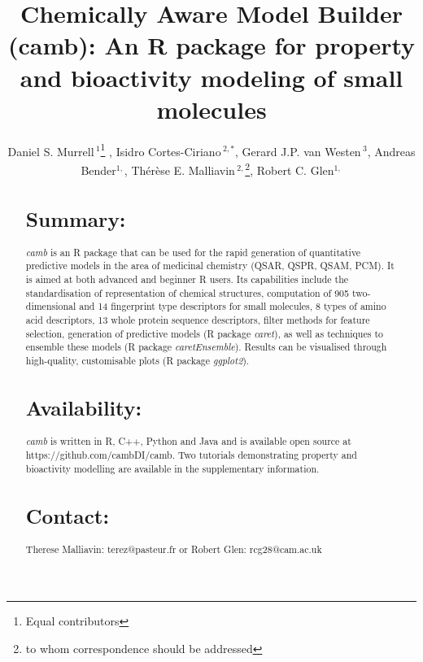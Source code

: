 \documentclass{bioinfo}
\begin{document}

\title{Chemically Aware Model Builder (camb): An R package for property and bioactivity modeling of small molecules}
\author[Murrell \& Cortes-Ciriano \it{et~al}]{Daniel S. Murrell\,$^{1}$\footnote{Equal contributors} , Isidro Cortes-Ciriano\,$^{2,*}$, Gerard J.P. van Westen\,$^{3}$, Andreas Bender$^{1,}$, Th\'er\`ese E. Malliavin\,$^{2,}$\footnote{to whom correspondence should be addressed},  Robert C. Glen$^{1,}$\dag}
\address{$^{1}$Unilever Centre for Molecular Science Informatics, Department of Chemistry, University of Cambridge, Lensfield Road, Cambridge CB2 1EW, United Kingdom.\\
$^{2}$Unite de Bioinformatique Structurale, Institut Pasteur and CNRS UMR 3825, Structural Biology and Chemistry Department, 25, rue Dr. Roux, 75 724 Paris, France.\\
$^{3}$European Molecular Biology Laboratory European Bioinformatics Institute Wellcome Trust Genome Campus, Hinxton, United Kingdom.}

\maketitle

\begin{abstract}
\section{Summary:}
{\it camb} is an R package that can be used for the rapid generation of quantitative predictive models in the area of medicinal chemistry (QSAR, QSPR, QSAM, PCM). It is aimed at both advanced and beginner R users.
Its capabilities include the standardisation of representation of chemical structures, computation of 905 two-dimensional and 14 fingerprint type descriptors for small molecules, 8 types of amino acid descriptors, 13 whole protein sequence descriptors, filter methods for feature selection, generation of predictive models (R package {\it caret}), as well as techniques to ensemble these models (R package {\it caretEnsemble}).
Results can be visualised through high-quality, customisable plots (R package {\it ggplot2}).
\section{Availability:} {\it camb} is written in R, C++, Python and Java and is available open source
at https://github.com/cambDI/camb.
Two tutorials demonstrating property and bioactivity modelling are available in the supplementary information.\\
\section{Contact:} Therese Malliavin: terez@pasteur.fr or Robert Glen: rcg28@cam.ac.uk
\end{abstract}
\end{document}
